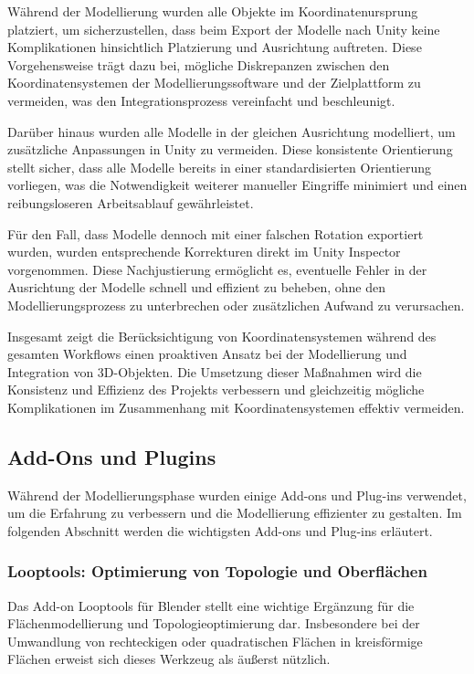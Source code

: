 Während der Modellierung wurden alle Objekte im Koordinatenursprung platziert, um sicherzustellen, dass beim Export
der Modelle nach Unity keine Komplikationen hinsichtlich Platzierung und Ausrichtung auftreten. Diese Vorgehensweise
trägt dazu bei, mögliche Diskrepanzen zwischen den Koordinatensystemen der Modellierungssoftware und der Zielplattform
zu vermeiden, was den Integrationsprozess vereinfacht und beschleunigt.

Darüber hinaus wurden alle Modelle in der gleichen Ausrichtung modelliert, um zusätzliche Anpassungen in Unity zu
vermeiden. Diese konsistente Orientierung stellt sicher, dass alle Modelle bereits in einer standardisierten
Orientierung vorliegen, was die Notwendigkeit weiterer manueller Eingriffe minimiert und einen reibungsloseren
Arbeitsablauf gewährleistet.

Für den Fall, dass Modelle dennoch mit einer falschen Rotation exportiert wurden, wurden entsprechende Korrekturen
direkt im Unity Inspector vorgenommen. Diese Nachjustierung ermöglicht es, eventuelle Fehler in der Ausrichtung der
Modelle schnell und effizient zu beheben, ohne den Modellierungsprozess zu unterbrechen oder zusätzlichen Aufwand zu
verursachen.

Insgesamt zeigt die Berücksichtigung von Koordinatensystemen während des gesamten Workflows einen proaktiven Ansatz
bei der Modellierung und Integration von 3D-Objekten. Die Umsetzung dieser Maßnahmen wird die Konsistenz und Effizienz
des Projekts verbessern und gleichzeitig mögliche Komplikationen im Zusammenhang mit Koordinatensystemen effektiv
vermeiden.

\subsection{Add-Ons und Plugins}
Während der Modellierungsphase wurden einige Add-ons und Plug-ins verwendet, um die Erfahrung zu verbessern und die
Modellierung effizienter zu gestalten. Im folgenden Abschnitt werden die wichtigsten Add-ons und Plug-ins erläutert.

\subsubsection{Looptools: Optimierung von Topologie und Oberflächen}
Das Add-on Looptools für Blender stellt eine wichtige Ergänzung für die Flächenmodellierung und Topologieoptimierung dar.
Insbesondere bei der Umwandlung von rechteckigen oder quadratischen Flächen in kreisförmige Flächen erweist sich dieses
Werkzeug als äußerst nützlich.

